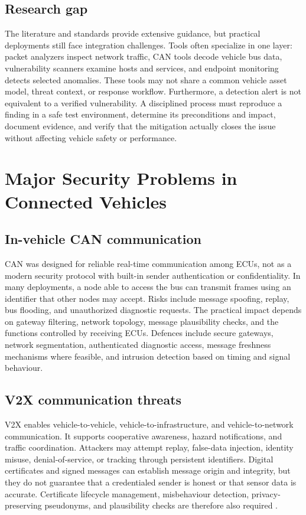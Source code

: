 \documentclass[11pt]{article}
\begin{document}
\subsection{Research gap}
The literature and standards provide extensive guidance, but practical deployments still face integration challenges. Tools often specialize in one layer: packet analyzers inspect network traffic, CAN tools decode vehicle bus data, vulnerability scanners examine hosts and services, and endpoint monitoring detects selected anomalies. These tools may not share a common vehicle asset model, threat context, or response workflow. Furthermore, a detection alert is not equivalent to a verified vulnerability. A disciplined process must reproduce a finding in a safe test environment, determine its preconditions and impact, document evidence, and verify that the mitigation actually closes the issue without affecting vehicle safety or performance.

\section{Major Security Problems in Connected Vehicles}
\subsection{In-vehicle CAN communication}
CAN was designed for reliable real-time communication among ECUs, not as a modern security protocol with built-in sender authentication or confidentiality. In many deployments, a node able to access the bus can transmit frames using an identifier that other nodes may accept. Risks include message spoofing, replay, bus flooding, and unauthorized diagnostic requests. The practical impact depends on gateway filtering, network topology, message plausibility checks, and the functions controlled by receiving ECUs. Defences include secure gateways, network segmentation, authenticated diagnostic access, message freshness mechanisms where feasible, and intrusion detection based on timing and signal behaviour.

\subsection{V2X communication threats}
V2X enables vehicle-to-vehicle, vehicle-to-infrastructure, and vehicle-to-network communication. It supports cooperative awareness, hazard notifications, and traffic coordination. Attackers may attempt replay, false-data injection, identity misuse, denial-of-service, or tracking through persistent identifiers. Digital certificates and signed messages can establish message origin and integrity, but they do not guarantee that a credentialed sender is honest or that sensor data is accurate. Certificate lifecycle management, misbehaviour detection, privacy-preserving pseudonyms, and plausibility checks are therefore also required \cite{yoshizawa2023}.
\end{document}
